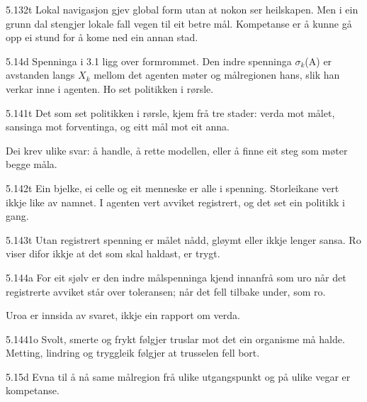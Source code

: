 \begin{formproposition}{5.132}{t}
Lokal navigasjon gjev global form utan at nokon ser heilskapen. Men i ein grunn dal stengjer lokale fall vegen til eit betre mål. Kompetanse er å kunne gå opp ei stund for å kome ned ein annan stad.
\end{formproposition}

\begin{formproposition}{5.14}{d}
Spenninga i 3.1 ligg over formrommet. Den indre spenninga \(σ_{k}\)(A) er avstanden langs \(X_{k}\) mellom det agenten møter og målregionen hans, slik han verkar inne i agenten. Ho set politikken i rørsle.
\end{formproposition}

\begin{formproposition}{5.141}{t}
Det som set politikken i rørsle, kjem frå tre stader: verda mot målet, sansinga mot forventinga, og eitt mål mot eit anna.

Dei krev ulike svar: å handle, å rette modellen, eller å finne eit steg som møter begge måla.
\end{formproposition}

\begin{formproposition}{5.142}{t}
Ein bjelke, ei celle og eit menneske er alle i spenning. Storleikane vert ikkje like av namnet. I agenten vert avviket registrert, og det set ein politikk i gang.
\end{formproposition}

\begin{formproposition}{5.143}{t}
Utan registrert spenning er målet nådd, gløymt eller ikkje lenger sansa. Ro viser difor ikkje at det som skal haldast, er trygt.
\end{formproposition}

\begin{formproposition}{5.144}{a}
For eit sjølv er den indre målspenninga kjend innanfrå som uro når det registrerte avviket står over toleransen; når det fell tilbake under, som ro.

Uroa er innsida av svaret, ikkje ein rapport om verda.
\end{formproposition}

\begin{formproposition}{5.1441}{o}
Svolt, smerte og frykt følgjer truslar mot det ein organisme må halde. Metting, lindring og tryggleik følgjer at trusselen fell bort.
\end{formproposition}

\begin{formproposition}{5.15}{d}
Evna til å nå same målregion frå ulike utgangspunkt og på ulike vegar er kompetanse.
\end{formproposition}

